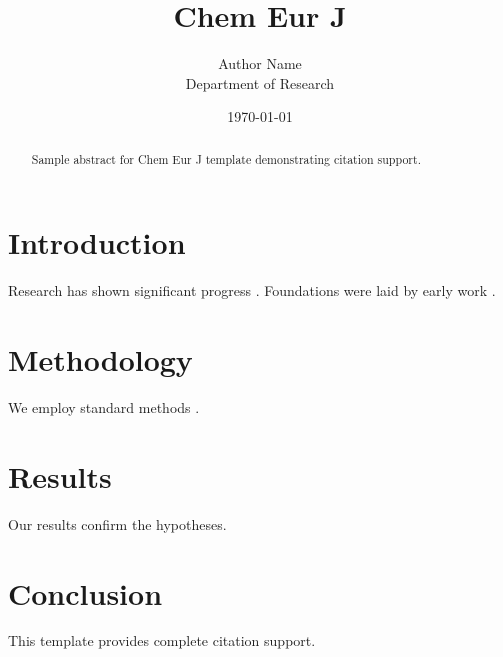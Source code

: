 \documentclass{wiley-nj}
\title{Chem Eur J}
\author{Author Name \\ \small Department of Research}
\date{\today}
\begin{document}
\maketitle

\begin{abstract}
Sample abstract for Chem Eur J template demonstrating citation support.
\end{abstract}

\section{Introduction}
Research has shown significant progress \citep{einstein1905}. Foundations were laid by early work \citep{turing1950}.

\section{Methodology}
We employ standard methods \citep{knuth1984}.

\section{Results}
Our results confirm the hypotheses.

\section{Conclusion}
This template provides complete citation support.



\end{document}
